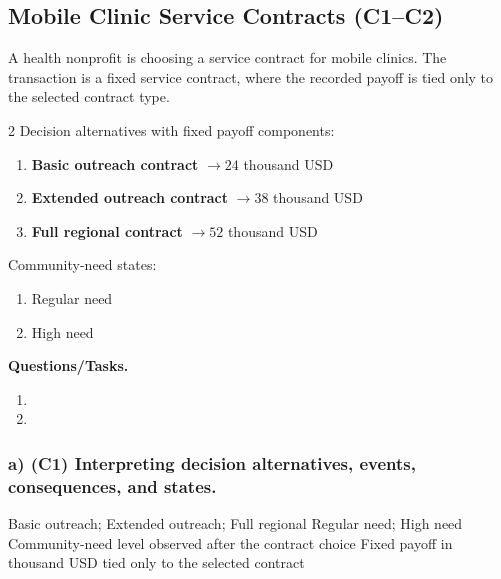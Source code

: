 	
	\subsection{Mobile Clinic Service Contracts (C1--C2)}
	\label{sec:problem9-mobile-clinic-service-contracts-c1-c2}
	A health nonprofit is choosing a service contract for mobile clinics. The transaction is a fixed service contract, where the recorded payoff is tied only to the selected contract type.
	
	\begin{multicols}{2}
		Decision alternatives with fixed payoff components:
		\begin{enumerate}[label=\arabic*.]
			\item \textbf{Basic outreach contract} $\to 24$ thousand USD
			\item \textbf{Extended outreach contract} $\to 38$ thousand USD
			\item \textbf{Full regional contract} $\to 52$ thousand USD
		\end{enumerate}
	
			\columnbreak
	
		Community-need states:
		\begin{enumerate}[label=\arabic*.]
			\item Regular need
			\item High need
		\end{enumerate}
	\end{multicols}

	\textbf{Questions/Tasks.}
	\begin{enumerate}[label=\textbf{\alph*)}]
		\item {}
		\item {}
	\end{enumerate}
	
	\subsubsection*{a) \textbf{(C1)} Interpreting decision alternatives, events, consequences, and states.}
	\label{subsec:problem9-mobile-clinic-service-contracts-c1}
	\DecisionElementsTable
	{Basic outreach; Extended outreach; Full regional}
	{Regular need; High need}
	{Community-need level observed after the contract choice}
	{Fixed payoff in thousand USD tied only to the selected contract}
	
